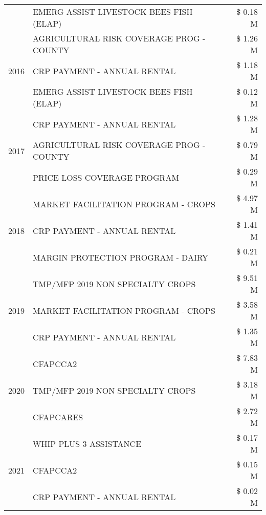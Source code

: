 \begin{tabular}{llr}
 & EMERG ASSIST LIVESTOCK BEES FISH (ELAP) & \$ 0.18 M \\
\cline{1-3}
\multirow[t]{3}{*}{2016} & AGRICULTURAL RISK COVERAGE PROG - COUNTY & \$ 1.26 M \\
 & CRP PAYMENT - ANNUAL RENTAL & \$ 1.18 M \\
 & EMERG ASSIST LIVESTOCK BEES FISH (ELAP) & \$ 0.12 M \\
\cline{1-3}
\multirow[t]{3}{*}{2017} & CRP PAYMENT - ANNUAL RENTAL & \$ 1.28 M \\
 & AGRICULTURAL RISK COVERAGE PROG - COUNTY & \$ 0.79 M \\
 & PRICE LOSS COVERAGE PROGRAM & \$ 0.29 M \\
\cline{1-3}
\multirow[t]{3}{*}{2018} & MARKET FACILITATION PROGRAM - CROPS & \$ 4.97 M \\
 & CRP PAYMENT - ANNUAL RENTAL & \$ 1.41 M \\
 & MARGIN PROTECTION PROGRAM - DAIRY & \$ 0.21 M \\
\cline{1-3}
\multirow[t]{3}{*}{2019} & TMP/MFP 2019 NON SPECIALTY CROPS & \$ 9.51 M \\
 & MARKET FACILITATION PROGRAM - CROPS & \$ 3.58 M \\
 & CRP PAYMENT - ANNUAL RENTAL & \$ 1.35 M \\
\cline{1-3}
\multirow[t]{3}{*}{2020} & CFAPCCA2 & \$ 7.83 M \\
 & TMP/MFP 2019 NON SPECIALTY CROPS & \$ 3.18 M \\
 & CFAPCARES & \$ 2.72 M \\
\cline{1-3}
\multirow[t]{3}{*}{2021} & WHIP PLUS 3 ASSISTANCE & \$ 0.17 M \\
 & CFAPCCA2 & \$ 0.15 M \\
 & CRP PAYMENT - ANNUAL RENTAL & \$ 0.02 M \\
\cline{1-3}
\bottomrule
\end{tabular}
